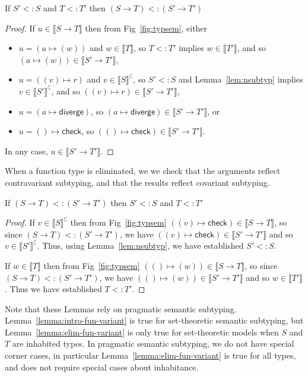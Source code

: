 \documentclass[acmsmall,review,screen]{acmart}
\newcommand{\DIVERGE}{\mathsf{diverge}}
\newcommand{\CHECK}{\mathsf{check}}
\newcommand{\fun}{\mathbin{\rightarrow}}
\newcommand{\sem}[1]{\llbracket{#1}\rrbracket}
\newcommand{\nsem}[1]{\llbracket{#1}\rrbracket^\complement}
\begin{document}
\begin{lemma}
  \label{lemma:intro-fun-variant}
  If $S' <: S$ and $T <: T'$
  then $(S \fun T) <: (S' \fun T')$
\end{lemma}
\begin{proof}
  If $u \in \sem{S \fun T}$
  then from Fig~\ref{fig:typsem}, either
  \begin{itemize}
  \item $u = (a \mapsto (w))$ and $w \in \sem{T}$, so $T <: T'$ implies
    $w \in \sem{T'}$, and so $(a \mapsto (w)) \in \sem{S' \fun T'}$,
  \item $u = ((v) \mapsto r)$ and $v \in \nsem{S}$, so $S' <: S$ and Lemma~\ref{lem:nsubtyp} implies
    $v \in \nsem{S'}$, and so $((v) \mapsto r) \in \sem{S' \fun T'}$,
  \item $u = (a \mapsto \DIVERGE)$, so $(a \mapsto \DIVERGE) \in \sem{S' \fun T'}$, or
  \item $u = () \mapsto \CHECK$, so $(() \mapsto \CHECK) \in \sem{S' \fun T'}$.
  \end{itemize}
  In any case, $u \in \sem{S' \fun T'}$.
\end{proof}
  
When a function type is eliminated, we
we check that the arguments reflect contravariant subtyping,
and that the results reflect covariant subtyping.

\begin{lemma}
  \label{lemma:elim-fun-variant}
  If $(S \fun T) <: (S' \fun T')$
  then $S' <: S$ and $T <: T'$
\end{lemma}
\begin{proof}
  If $v \in \nsem{S}$ then from Fig~\ref{fig:typsem}
  $((v) \mapsto \CHECK) \in \sem{S \fun T}$, so since 
  $(S \fun T) <: (S' \fun T')$, we have $((v) \mapsto \CHECK) \in \sem{S' \fun T'}$
  and so $v \in \nsem{S'}$. Thus, using Lemma~\ref{lem:nsubtyp},
  we have established $S' <: S$.

  If $w \in \sem{T}$ then from Fig~\ref{fig:typsem}
  $(() \mapsto (w)) \in \sem{S \fun T}$, so since 
  $(S \fun T) <: (S' \fun T')$, we have $(() \mapsto (w)) \in \sem{S' \fun T'}$
  and so $w \in \sem{T'}$. Thus we have established $T <: T'$.
\end{proof}

Note that these Lemmas rely on pragmatic semantic subtyping.
Lemma~\ref{lemma:intro-fun-variant} is true for set-theoretic
semantic subtyping, but Lemma~\ref{lemma:elim-fun-variant}
is only true for set-theoretic models when $S$ and $T$ are inhabited types.
In pragmatic semantic subtyping, we do not have special corner cases, in particular
Lemma~\ref{lemma:elim-fun-variant} is true for all types,
and does not require special cases about inhabitance.
\end{document}
